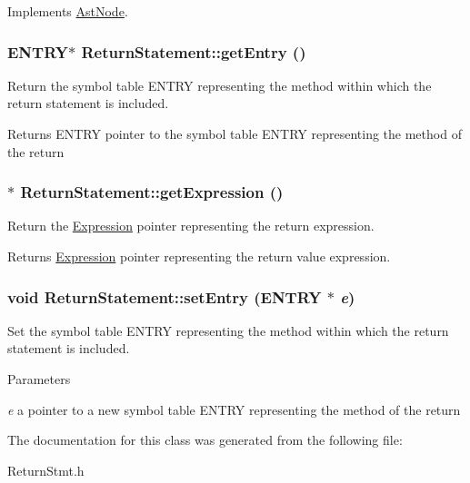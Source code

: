 Implements \hyperlink{classAstNode_a67b2d6ce1262da2954fb4db255759fb3}{AstNode}.\hypertarget{classReturnStatement_acecfc9f66e24cc51f1038234cf886229}{
\subsubsection[{getEntry}]{\setlength{\rightskip}{0pt plus 5cm}ENTRY$\ast$ ReturnStatement::getEntry ()}}
\label{classReturnStatement_acecfc9f66e24cc51f1038234cf886229}
Return the symbol table ENTRY representing the method within which the return statement is included.

\begin{DoxyReturn}{Returns}
ENTRY pointer to the symbol table ENTRY representing the method of the return 
\end{DoxyReturn}
\hypertarget{classReturnStatement_a219347b1f7f79387888f3252a7e07bad}{
\subsubsection[{getExpression}]{$\ast$ ReturnStatement::getExpression ()}}
\label{classReturnStatement_a219347b1f7f79387888f3252a7e07bad}
Return the \hyperlink{classExpression}{Expression} pointer representing the return expression.

\begin{DoxyReturn}{Returns}
\hyperlink{classExpression}{Expression} pointer representing the return value expression. 
\end{DoxyReturn}
\hypertarget{classReturnStatement_a92ec20af78eb69baae892b95946ceeb5}{
\subsubsection[{setEntry}]{\setlength{\rightskip}{0pt plus 5cm}void ReturnStatement::setEntry (ENTRY $\ast$ {\em e})}}
\label{classReturnStatement_a92ec20af78eb69baae892b95946ceeb5}
Set the symbol table ENTRY representing the method within which the return statement is included.


\begin{DoxyParams}{Parameters}
\item[{\em e}]a pointer to a new symbol table ENTRY representing the method of the return \end{DoxyParams}


The documentation for this class was generated from the following file:\begin{DoxyCompactItemize}
\item 
ReturnStmt.h\end{DoxyCompactItemize}
